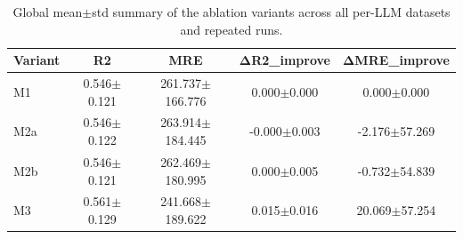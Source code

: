 \begin{table}[t]
\centering
\small
\caption{Global mean$\pm$std summary of the ablation variants across all per-LLM datasets and repeated runs.}
\label{tab:ablation_global}
\begin{tabular}{lcccc}
\toprule
Variant & R2 & MRE & ΔR2_improve & ΔMRE_improve \\
\midrule
M1 & 0.546$\pm$0.121 & 261.737$\pm$166.776 & 0.000$\pm$0.000 & 0.000$\pm$0.000 \\
M2a & 0.546$\pm$0.122 & 263.914$\pm$184.445 & -0.000$\pm$0.003 & -2.176$\pm$57.269 \\
M2b & 0.546$\pm$0.121 & 262.469$\pm$180.995 & 0.000$\pm$0.005 & -0.732$\pm$54.839 \\
M3 & 0.561$\pm$0.129 & 241.668$\pm$189.622 & 0.015$\pm$0.016 & 20.069$\pm$57.254 \\
\bottomrule
\end{tabular}
\end{table}